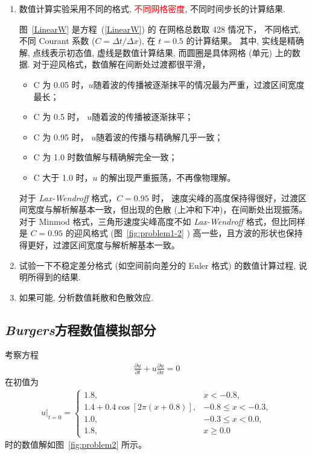 \documentclass[10.5pt
]{article}
\begin{document}
\begin{enumerate}
\item
	数值计算实验采用不同的格式, \textcolor{red}{不同网格密度}, 不同时间步长的计算结果.

图~\ref{LinearW} 是方程~(\ref{LinearW}) 的
在网格总数取 428 情况下，
不同格式, 不同 Courant 系数 ($C = \Delta t / \Delta x$), 在 $t = 0.5$ 的计算结果。
其中, 实线是精确解, 点线表示初态值, 虚线是数值计算结果, 而圆圈是具体网格 (单元) 上的数据. 
对于迎风格式，数值解在间断处过渡都很平滑，
\begin{itemize}
	\item C 为 0.05 时，$u$随着波的传播被逐渐抹平的情况最为严重，过渡区间宽度最长；
	\item C 为 0.5 时， $u$随着波的传播被逐渐抹平；
	\item C 为 0.95 时， $u$随着波的传播与精确解几乎一致；
	\item C 为 1.0 时数值解与精确解完全一致；
	\item C 大于 1.0 时，$u$ 的解出现严重振荡，不再像物理解。
\end{itemize}
对于 \textit{Lax-Wendroff} 格式，$C=0.95$ 时， 速度尖峰的高度保持得很好，过渡区间宽度与解析解基本一致，但出现的色散 (上冲和下冲)，在间断处出现振荡。
对于 Minmod 格式，三角形速度尖峰高度不如 \textit{Lax-Wendroff} 格式，但比同样是 $C = 0.95$ 的迎风格式 (图~\ref{fig:problem1-2} ) 高一些，且方波的形状也保持得更好，过渡区间宽度与解析解基本一致。

\item
 {\color{red} 试验一下不稳定差分格式 (如空间前向差分的 Euler 格式) 的数值计算过程, 说明所得到的结果.}
\item
  { \color{red} 如果可能, 分析数值耗散和色散效应.}
\end{enumerate}


\subsection{\textit{Burgers}方程数值模拟部分}
考察方程
\begin{align}
\frac{\partial u}{\partial t} + u \frac{\partial u}{\partial x} = 0
\end{align}
在初值为
\begin{align}
u|_{t=0} = \left\{\begin{array}{ll} 1.8, & x < -0.8,
\\
1.4 + 0.4 \cos\left[2 \pi (x + 0.8) \right], & -0.8 \le x < -0.3,
\\
1.0, & -0.3 \le x < 0.0,
\\
1.8, & x \ge 0.0
\end{array} \right.
\end{align}
时的数值解如图~\ref{fig:problem2} 所示。
\end{document}
